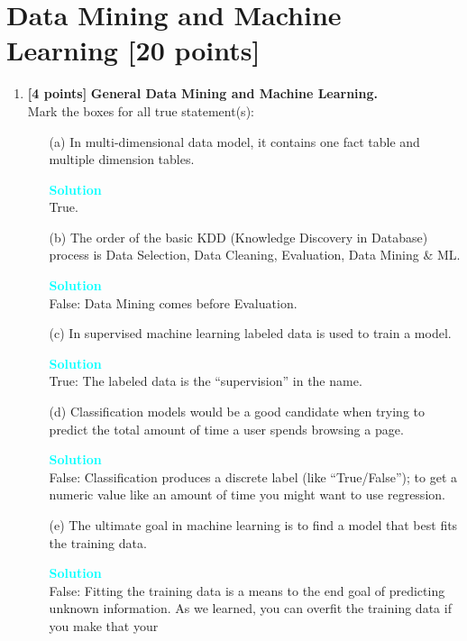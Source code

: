 \documentclass[10pt]{article}
\newenvironment{solution}
    { \begin{mdframed}[backgroundcolor=gray!10] \textcolor{cyan}{\textbf{Solution}} \\}
    {  \end{mdframed}}
\begin{document}
\section{Data Mining and Machine Learning \textbf{[20 points]}}

\begin{enumerate}

\item \textbf{[4 points]} \textbf{General Data Mining and Machine Learning.} \\
	      Mark the boxes for all true statement(s):
	      \begin{itemize}
		      \item[(a)] In multi-dimensional data model, it contains one fact table and multiple dimension tables.
		            \begin{solution}
			            True.
		            \end{solution}
		      \item[(b)] The order of the basic KDD (Knowledge Discovery in Database) process is Data Selection, Data Cleaning, Evaluation, Data Mining \& ML.
		            \begin{solution}
			            False: Data Mining comes before Evaluation.
		            \end{solution}
		      \item[(c)] In supervised machine learning labeled data is used to train a model.
		            \begin{solution}
			            True: The labeled data is the “supervision” in the name.
		            \end{solution}
		      \item[(d)] Classification models would be a good candidate when trying to predict the total
		            amount of time a user spends browsing a page.
		            \begin{solution}
			            False: Classification produces a discrete label (like “True/False”);
			            to get a numeric value like an amount of time you might want to use regression.
		            \end{solution}
		      \item[(e)] The ultimate goal in machine learning is to find a model that best fits the training data.
		            \begin{solution}
			            False: Fitting the training data is a means to the end goal of predicting unknown
			            information.  As we learned, you can overfit the training data if you make that your

\end{solution}
\end{itemize}
\end{enumerate}
\end{document}
